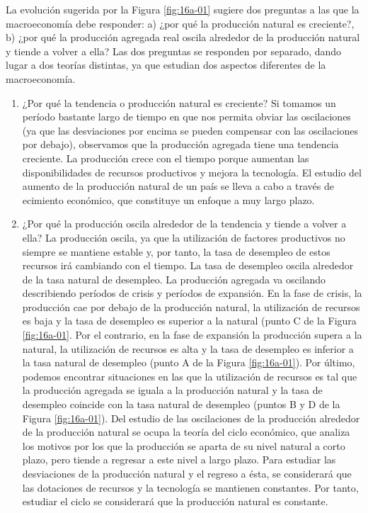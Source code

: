 \documentclass[
]{krantz}
\begin{document}
La evolución sugerida por la Figura \ref{fig:16a-01} sugiere dos preguntas a las que la macroeconomía debe responder: a) ¿por qué la producción natural es creciente?, b) ¿por qué la producción agregada real oscila alrededor de la producción natural y tiende a volver a ella? Las dos preguntas se responden por separado, dando lugar a dos teorías distintas, ya que estudian dos aspectos diferentes de la macroeconomía.

\begin{enumerate}
\def\labelenumi{\alph{enumi})}
\item
  ¿Por qué la tendencia o producción natural es creciente? Si tomamos un período bastante largo de tiempo en que nos permita obviar las oscilaciones (ya que las desviaciones por encima se pueden compensar con las oscilaciones por debajo), observamos que la producción agregada tiene una tendencia creciente. La producción crece con el tiempo porque aumentan las disponibilidades de recursos productivos y mejora la tecnología. El estudio del aumento de la producción natural de un país se lleva a cabo a través de ecimiento económico, que constituye un enfoque a muy largo plazo.
\item
  ¿Por qué la producción oscila alrededor de la tendencia y tiende a volver a ella? La producción oscila, ya que la utilización de factores productivos no siempre se mantiene estable y, por tanto, la tasa de desempleo de estos recursos irá cambiando con el tiempo. La tasa de desempleo oscila alrededor de la tasa natural de desempleo. La producción agregada va oscilando describiendo períodos de crisis y períodos de expansión. En la fase de crisis, la producción cae por debajo de la producción natural, la utilización de recursos es baja y la tasa de desempleo es superior a la natural (punto C de la Figura \ref{fig:16a-01}. Por el contrario, en la fase de expansión la producción supera a la natural, la utilización de recursos es alta y la tasa de desempleo es inferior a la tasa natural de desempleo (punto A de la Figura \ref{fig:16a-01}). Por último, podemos encontrar situaciones en las que la utilización de recursos es tal que la producción agregada se iguala a la producción natural y la tasa de desempleo coincide con la tasa natural de desempleo (puntos B y D de la Figura \ref{fig:16a-01}). Del estudio de las oscilaciones de la producción alrededor de la producción natural se ocupa la teoría del ciclo económico, que analiza los motivos por los que la producción se aparta de su nivel natural a corto plazo, pero tiende a regresar a este nivel a largo plazo. Para estudiar las desviaciones de la producción natural y el regreso a ésta, se considerará que las dotaciones de recursos y la tecnología se mantienen constantes. Por tanto, estudiar el ciclo se considerará que la producción natural es constante.
\end{enumerate}
\end{document}
